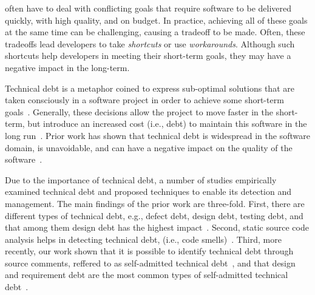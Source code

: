 \documentclass[10pt,journal,compsoc]{IEEEtran}
\newcommand{\SATD}{self-admitted technical debt\xspace}
\begin{document}

 often have to deal with conflicting goals that require software to be delivered quickly, with high quality, and on budget. In practice, achieving all of these goals at the same time can be challenging, causing a tradeoff to be made. Often, these tradeoffs lead developers to take \emph{shortcuts} or use \emph{workarounds}. Although such shortcuts help developers in meeting their short-term goals, they may have a negative impact in the long-term.

Technical debt is a metaphor coined to express sub-optimal solutions that are taken consciously in a software project in order to achieve some short-term goals~\cite{Cunningham1992WPM}. Generally, these decisions allow the project to move faster in the short-term, but introduce an increased cost (i.e., debt) to maintain this software in the long run~\cite{Seaman2011,Kruchten2013IWMTD}. Prior work has shown that technical debt is widespread in the software domain, is unavoidable, and can have a negative impact on the quality of the software~\cite{Lim2012Software}.

Due to the importance of technical debt, a number of studies empirically examined technical debt and proposed techniques to enable its detection and management. The main findings of the prior work are three-fold. First, there are different types of technical debt, e.g., defect debt, design debt, testing debt, and that among them design debt has the highest impact~\cite{Alves2014MTD,Marinescu2012IBM}. Second, static source code analysis helps in detecting technical debt, (i.e., code smells)~\cite{Marinescu2004ICSM,Marinescu2010CSMR,Zazworka2013CSE}. Third, more recently, our work shown that it is possible to identify technical debt through source comments, reffered to as  \SATD~\cite{Potdar2014ICSME}, and that design and requirement debt are the most common types of \SATD~\cite{Maldonado2015MTD}.
\end{document}
